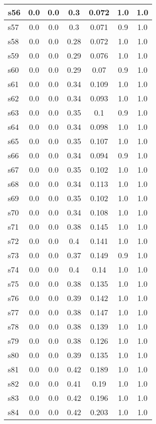 \documentclass{article}
\begin{document}
\begin{tabular}{|l|c|c|c|c|c|c|}
\hline
s56 &0.0 & 0.0 & 0.3 & 0.072 & 1.0 & 1.0\\
\hline
s57 &0.0 & 0.0 & 0.3 & 0.071 & 0.9 & 1.0\\
\hline
s58 &0.0 & 0.0 & 0.28 & 0.072 & 1.0 & 1.0\\
\hline
s59 &0.0 & 0.0 & 0.29 & 0.076 & 1.0 & 1.0\\
\hline
s60 &0.0 & 0.0 & 0.29 & 0.07 & 0.9 & 1.0\\
\hline
s61 &0.0 & 0.0 & 0.34 & 0.109 & 1.0 & 1.0\\
\hline
s62 &0.0 & 0.0 & 0.34 & 0.093 & 1.0 & 1.0\\
\hline
s63 &0.0 & 0.0 & 0.35 & 0.1 & 0.9 & 1.0\\
\hline
s64 &0.0 & 0.0 & 0.34 & 0.098 & 1.0 & 1.0\\
\hline
s65 &0.0 & 0.0 & 0.35 & 0.107 & 1.0 & 1.0\\
\hline
s66 &0.0 & 0.0 & 0.34 & 0.094 & 0.9 & 1.0\\
\hline
s67 &0.0 & 0.0 & 0.35 & 0.102 & 1.0 & 1.0\\
\hline
s68 &0.0 & 0.0 & 0.34 & 0.113 & 1.0 & 1.0\\
\hline
s69 &0.0 & 0.0 & 0.35 & 0.102 & 1.0 & 1.0\\
\hline
s70 &0.0 & 0.0 & 0.34 & 0.108 & 1.0 & 1.0\\
\hline
s71 &0.0 & 0.0 & 0.38 & 0.145 & 1.0 & 1.0\\
\hline
s72 &0.0 & 0.0 & 0.4 & 0.141 & 1.0 & 1.0\\
\hline
s73 &0.0 & 0.0 & 0.37 & 0.149 & 0.9 & 1.0\\
\hline
s74 &0.0 & 0.0 & 0.4 & 0.14 & 1.0 & 1.0\\
\hline
s75 &0.0 & 0.0 & 0.38 & 0.135 & 1.0 & 1.0\\
\hline
s76 &0.0 & 0.0 & 0.39 & 0.142 & 1.0 & 1.0\\
\hline
s77 &0.0 & 0.0 & 0.38 & 0.147 & 1.0 & 1.0\\
\hline
s78 &0.0 & 0.0 & 0.38 & 0.139 & 1.0 & 1.0\\
\hline
s79 &0.0 & 0.0 & 0.38 & 0.126 & 1.0 & 1.0\\
\hline
s80 &0.0 & 0.0 & 0.39 & 0.135 & 1.0 & 1.0\\
\hline
s81 &0.0 & 0.0 & 0.42 & 0.189 & 1.0 & 1.0\\
\hline
s82 &0.0 & 0.0 & 0.41 & 0.19 & 1.0 & 1.0\\
\hline
s83 &0.0 & 0.0 & 0.42 & 0.196 & 1.0 & 1.0\\
\hline
s84 &0.0 & 0.0 & 0.42 & 0.203 & 1.0 & 1.0\\

\end{tabular}
\end{document}
